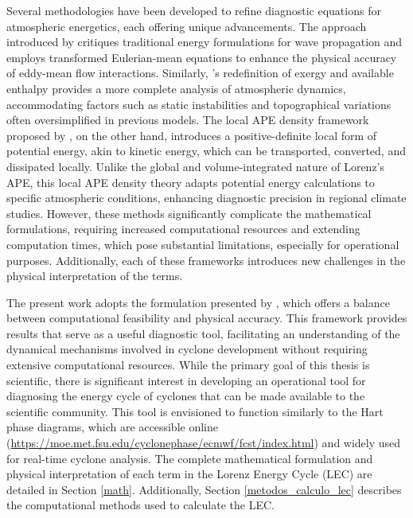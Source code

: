 Several methodologies have been developed to refine diagnostic equations for atmospheric energetics, each offering unique advancements. The approach introduced by \citet{plumb1983new} critiques traditional energy formulations for wave propagation and employs transformed Eulerian-mean equations to enhance the physical accuracy of eddy-mean flow interactions. Similarly, \citet{marquet1991concept}'s redefinition of exergy and available enthalpy provides a more complete analysis of atmospheric dynamics, accommodating factors such as static instabilities and topographical variations often oversimplified in previous models. The local APE density framework proposed by \citet{novak2018local}, on the other hand, introduces a positive-definite local form of potential energy, akin to kinetic energy, which can be transported, converted, and dissipated locally. Unlike the global and volume-integrated nature of Lorenz’s APE, this local APE density theory adapts potential energy calculations to specific atmospheric conditions, enhancing diagnostic precision in regional climate studies. However, these methods significantly complicate the mathematical formulations, requiring increased computational resources and extending computation times, which pose substantial limitations, especially for operational purposes. Additionally, each of these frameworks introduces new challenges in the physical interpretation of the terms.

The present work adopts the formulation presented by \citet{michaelides1999quasi}, which offers a balance between computational feasibility and physical accuracy. This framework provides results that serve as a useful diagnostic tool, facilitating an understanding of the dynamical mechanisms involved in cyclone development without requiring extensive computational resources. While the primary goal of this thesis is scientific, there is significant interest in developing an operational tool for diagnosing the energy cycle of cyclones that can be made available to the scientific community. This tool is envisioned to function similarly to the Hart phase diagrams, which are accessible online (\href{https://moe.met.fsu.edu/cyclonephase/ecmwf/fcst/index.html}{https://moe.met.fsu.edu/cyclonephase/ecmwf/fcst/index.html}) and widely used for real-time cyclone analysis. The complete mathematical formulation and physical interpretation of each term in the Lorenz Energy Cycle (LEC) are detailed in Section \ref{math}. Additionally, Section \ref{metodos_calculo_lec} describes the computational methods used to calculate the LEC.


